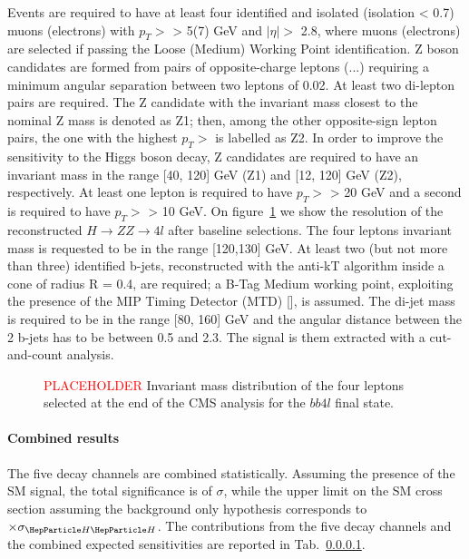 Events are required to have at least four identified and isolated (isolation < 0.7) muons (electrons) with $p_T >$ > 5(7) GeV and $|\eta| >$ 2.8, where muons (electrons) are selected if passing the Loose (Medium) Working Point identification. Z boson candidates are formed from pairs of opposite-charge leptons (...) requiring a minimum angular separation between two leptons of 0.02. At least two di-lepton pairs are required. The Z candidate with the invariant mass closest to the nominal Z mass is denoted as Z1; then, among the other opposite-sign lepton pairs, the one with the highest $p_T >$ is labelled as Z2. In order to improve the sensitivity to the Higgs boson decay, Z candidates are required to have an invariant mass in the range [40, 120] GeV (Z1) and [12, 120] GeV (Z2), respectively. At least one lepton is required to have $p_T >$ > 20 GeV and a second is required to have $p_T >$ > 10 GeV. On figure~\ref{fig:CMS_HH4l} we show the resolution of the reconstructed $H \rightarrow ZZ \rightarrow 4l$ after baseline selections. The four leptons invariant mass is requested to be in the range [120,130] GeV. At least two (but not more than three) identified b-jets, reconstructed with the anti-kT algorithm inside a cone of radius R = 0.4, are required; a B-Tag Medium working point, exploiting the presence of the MIP Timing Detector (MTD) [], is assumed. The di-jet mass is required to be in the range [80, 160] GeV and the angular distance between the 2 b-jets has to be between 0.5 and 2.3. The signal is them extracted with a cut-and-count analysis.

\begin{figure}[!htb]
\centering 
\caption{\textcolor{red}{PLACEHOLDER} Invariant mass distribution of the four leptons selected at the end of the CMS analysis for the $bb 4l$ final state.} 
\label{fig:CMS_HH4l} 
\end{figure}

\paragraph{Combined results}

The five decay channels are combined statistically.
Assuming the presence of the SM \HH signal, the total significance is of $\sigma$, while the upper limit on the SM \HH cross section assuming the background only hypothesis corresponds to $\times\sigma_{\HH}$.
The contributions from the five decay channels and the combined expected sensitivities are reported in Tab.~\ref{}.


